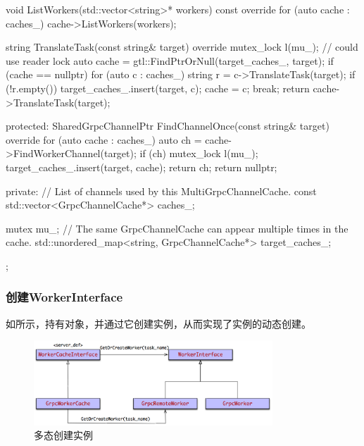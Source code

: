 \begin{content}
\begin{leftbar}
\begin{c++}
{  void ListWorkers(std::vector<string>* workers) const override {
    for (auto cache : caches_) {
      cache->ListWorkers(workers);
    }
  }

  string TranslateTask(const string& target) override {
    mutex_lock l(mu_);  // could use reader lock
    auto cache = gtl::FindPtrOrNull(target_caches_, target);
    if (cache == nullptr) {
      for (auto c : caches_) {
        string r = c->TranslateTask(target);
        if (!r.empty()) {
          target_caches_.insert({target, c});
          cache = c;
          break;
        }
      }
    }
    return cache->TranslateTask(target);
  }

 protected:
  SharedGrpcChannelPtr FindChannelOnce(const string& target) override {
    for (auto cache : caches_) {
      auto ch = cache->FindWorkerChannel(target);
      if (ch) {
        mutex_lock l(mu_);
        target_caches_.insert({target, cache});
        return ch;
      }
    }
    return nullptr;
  }

 private:
  // List of channels used by this MultiGrpcChannelCache.
  const std::vector<GrpcChannelCache*> caches_;

  mutex mu_;
  // The same GrpcChannelCache can appear multiple times in the cache.
  std::unordered_map<string, GrpcChannelCache*> target_caches_;
};
\end{c++}
\end{leftbar}

\subsubsection{创建WorkerInterface}

如所示，持有对象，并通过它创建实例，从而实现了实例的动态创建。

\begin{figure}[H]
\centering
\includegraphics[width=0.8\textwidth]{figures/dist-worker-cache-interface.png}
\caption{多态创建实例}
 \label{fig:dist-worker-cache-interface}
\end{figure}


\end{content}
